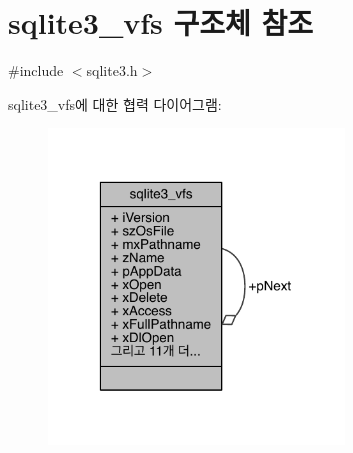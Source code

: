 \hypertarget{structsqlite3__vfs}{}\section{sqlite3\+\_\+vfs 구조체 참조}
\label{structsqlite3__vfs}


{\ttfamily \#include $<$sqlite3.\+h$>$}



sqlite3\+\_\+vfs에 대한 협력 다이어그램\+:
\nopagebreak
\begin{figure}[H]
\begin{center}
\leavevmode
\includegraphics[width=223pt]{structsqlite3__vfs__coll__graph}
\end{center}
\end{figure}
